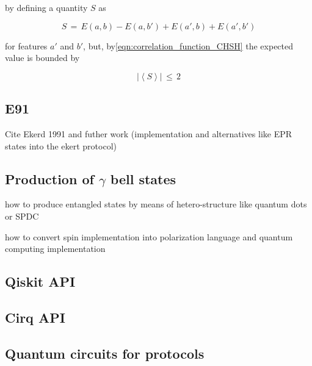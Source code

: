 by defining a quantity $S$ as

\begin{equation}\label{eqn:S_quantity_CHSH}
S\,=\,E(a,b) - E(a,b') + E(a',b) + E(a',b')
\end{equation}

for features $a'$ and $b'$, but, by\ref{eqn:correlation_function_CHSH} the expected value is bounded by 

\begin{equation}\label{eqn:CHSH_inequality}
\left\vert \left\langle S \right\rangle\right\vert\,\leq\,2
\end{equation}


\subsection{E91}

Cite Ekerd 1991 \cite{ekert1991quantum} and futher work (implementation and alternatives like EPR states into the ekert protocol)

\subsection{Production of $\gamma$ bell states}

how to produce entangled states by means of hetero-structure like quantum dots or SPDC

how to convert spin implementation into polarization language and quantum computing implementation

\subsection{Qiskit API}

\subsection{Cirq API}

\subsection{Quantum circuits for protocols}